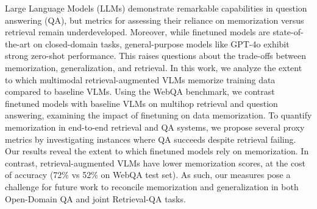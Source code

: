 
Large Language Models (LLMs) demonstrate remarkable capabilities in question answering (QA), but metrics for assessing their reliance on memorization versus retrieval remain underdeveloped. Moreover, while finetuned models are state-of-the-art on closed-domain tasks, general-purpose models like GPT-4o exhibit strong zero-shot performance. This raises questions about the trade-offs between memorization, generalization, and retrieval. In this work, we analyze the extent to which multimodal retrieval-augmented VLMs memorize training data compared to baseline VLMs. Using the WebQA benchmark, we contrast finetuned models with baseline VLMs on multihop retrieval and question answering, examining the impact of finetuning on data memorization. To quantify memorization in end-to-end retrieval and QA systems, we propose several proxy metrics by investigating instances where QA succeeds despite retrieval failing. Our results reveal the extent to which finetuned models rely on memorization. In contrast, retrieval-augmented VLMs have lower memorization scores, at the cost of accuracy (72\% vs 52\% on WebQA test set). As such, our measures pose a challenge for future work to reconcile memorization and generalization in both Open-Domain QA and joint Retrieval-QA tasks.


